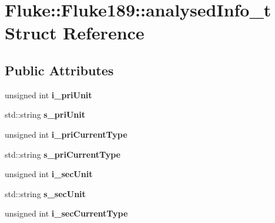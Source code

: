 \hypertarget{structFluke_1_1Fluke189_1_1analysedInfo__t}{
\section{Fluke::Fluke189::analysedInfo\_\-t Struct Reference}
\label{structFluke_1_1Fluke189_1_1analysedInfo__t}
}
\subsection*{Public Attributes}
\begin{DoxyCompactItemize}
\item 
\hypertarget{structFluke_1_1Fluke189_1_1analysedInfo__t_a2d8ff510e0aae37c8131d7f7eddf8d9f}{
unsigned int {\bfseries i\_\-priUnit}}
\label{structFluke_1_1Fluke189_1_1analysedInfo__t_a2d8ff510e0aae37c8131d7f7eddf8d9f}

\item 
\hypertarget{structFluke_1_1Fluke189_1_1analysedInfo__t_a531f2362657cf316c8af7d49cab3628a}{
std::string {\bfseries s\_\-priUnit}}
\label{structFluke_1_1Fluke189_1_1analysedInfo__t_a531f2362657cf316c8af7d49cab3628a}

\item 
\hypertarget{structFluke_1_1Fluke189_1_1analysedInfo__t_adf61e37ded012876e4961a34dfc69bd8}{
unsigned int {\bfseries i\_\-priCurrentType}}
\label{structFluke_1_1Fluke189_1_1analysedInfo__t_adf61e37ded012876e4961a34dfc69bd8}

\item 
\hypertarget{structFluke_1_1Fluke189_1_1analysedInfo__t_a6ec41f96e3caa78e51adbbb7082355f3}{
std::string {\bfseries s\_\-priCurrentType}}
\label{structFluke_1_1Fluke189_1_1analysedInfo__t_a6ec41f96e3caa78e51adbbb7082355f3}

\item 
\hypertarget{structFluke_1_1Fluke189_1_1analysedInfo__t_a4244ef48aef85af4d312dd4c375b7498}{
unsigned int {\bfseries i\_\-secUnit}}
\label{structFluke_1_1Fluke189_1_1analysedInfo__t_a4244ef48aef85af4d312dd4c375b7498}

\item 
\hypertarget{structFluke_1_1Fluke189_1_1analysedInfo__t_adb72035d3786992e1556ad572c0877cf}{
std::string {\bfseries s\_\-secUnit}}
\label{structFluke_1_1Fluke189_1_1analysedInfo__t_adb72035d3786992e1556ad572c0877cf}

\item 
\hypertarget{structFluke_1_1Fluke189_1_1analysedInfo__t_a5660dbab0fc42acc7fb92bbe8c3ab861}{
unsigned int {\bfseries i\_\-secCurrentType}}
\label{structFluke_1_1Fluke189_1_1analysedInfo__t_a5660dbab0fc42acc7fb92bbe8c3ab861}


\end{DoxyCompactItemize}
